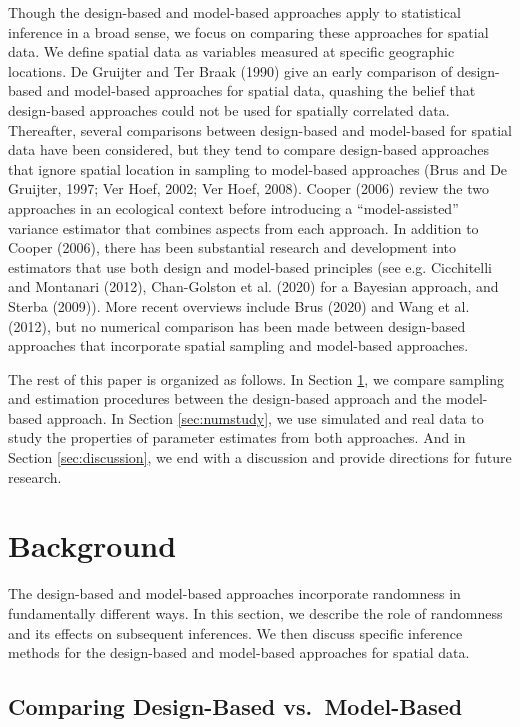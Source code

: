 \documentclass[]{elsarticle} %
\begin{document}
Though the design-based and model-based approaches apply to statistical
inference in a broad sense, we focus on comparing these approaches for
spatial data. We define spatial data as variables measured at specific
geographic locations. De Gruijter and Ter Braak (1990) give an early
comparison of design-based and model-based approaches for spatial data,
quashing the belief that design-based approaches could not be used for
spatially correlated data. Thereafter, several comparisons between
design-based and model-based for spatial data have been considered, but
they tend to compare design-based approaches that ignore spatial
location in sampling to model-based approaches (Brus and De Gruijter,
1997; Ver Hoef, 2002; Ver Hoef, 2008). Cooper (2006) review the two
approaches in an ecological context before introducing a
``model-assisted'' variance estimator that combines aspects from each
approach. In addition to Cooper (2006), there has been substantial
research and development into estimators that use both design and
model-based principles (see e.g. Cicchitelli and Montanari (2012),
Chan-Golston et al. (2020) for a Bayesian approach, and Sterba (2009)).
More recent overviews include Brus (2020) and Wang et al. (2012), but no
numerical comparison has been made between design-based approaches that
incorporate spatial sampling and model-based approaches.

The rest of this paper is organized as follows. In Section
\ref{sec:background}, we compare sampling and estimation procedures
between the design-based approach and the model-based approach. In
Section \ref{sec:numstudy}, we use simulated and real data to study the
properties of parameter estimates from both approaches. And in Section
\ref{sec:discussion}, we end with a discussion and provide directions
for future research.

\hypertarget{sec:background}{%
\section{Background}\label{sec:background}}

The design-based and model-based approaches incorporate randomness in
fundamentally different ways. In this section, we describe the role of
randomness and its effects on subsequent inferences. We then discuss
specific inference methods for the design-based and model-based
approaches for spatial data.

\hypertarget{comparing-design-based-vs.-model-based}{%
\subsection{Comparing Design-Based
vs.~Model-Based}\label{comparing-design-based-vs.-model-based}}
\end{document}

